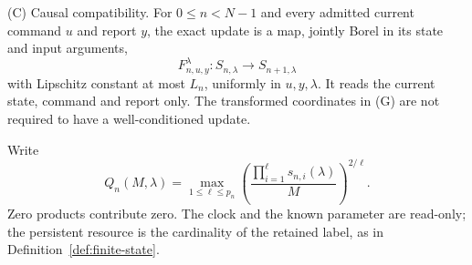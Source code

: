 \documentclass[11pt]{amsart}
\theoremstyle{definition}\newtheorem{definition}[theorem]{Definition}
\theoremstyle{remark}\newtheorem{remark}[theorem]{Remark}
\begin{document}
\smallskip\noindent\textup{(C) Causal compatibility.}
For $0\le n<N-1$ and every admitted current command $u$ and report $y$, the exact update
is a map, jointly Borel in its state and input arguments,
\[
 F_{n,u,y}^{\lambda}:S_{n,\lambda}\longrightarrow S_{n+1,\lambda}
\]
with Lipschitz constant at most $L_n$, uniformly in $u,y,\lambda$.
It reads the current state, command and report only. The transformed
coordinates in (G) are not required to have a well-conditioned update.

Write
\begin{equation}\label{eq:transfer-profile}
 Q_n(M,\lambda)=\max_{1\le\ell\le p_n}
       \left(\frac{\prod_{i=1}^{\ell}s_{n,i}(\lambda)}{M}
       \right)^{2/\ell}.
\end{equation}
Zero products contribute zero. The clock and the known parameter are
read-only; the persistent resource is the cardinality of the retained
label, as in Definition~\ref{def:finite-state}.
\end{document}
